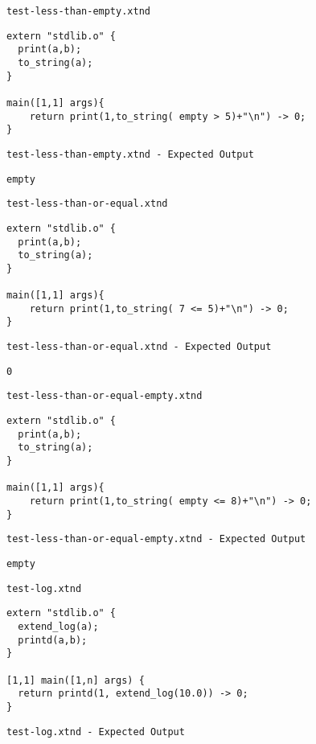 \medskip \noindent \texttt{test-less-than-empty.xtnd}


\begin{lstlisting}
extern "stdlib.o" {
  print(a,b);
  to_string(a);
}

main([1,1] args){
	return print(1,to_string( empty > 5)+"\n") -> 0;
}
\end{lstlisting}


\medskip \noindent \texttt{test-less-than-empty.xtnd - Expected Output}


\begin{lstlisting}
empty
\end{lstlisting}


\medskip \noindent \texttt{test-less-than-or-equal.xtnd}


\begin{lstlisting}
extern "stdlib.o" {
  print(a,b);
  to_string(a);
}

main([1,1] args){
	return print(1,to_string( 7 <= 5)+"\n") -> 0;
}
\end{lstlisting}


\medskip \noindent \texttt{test-less-than-or-equal.xtnd - Expected Output}


\begin{lstlisting}
0
\end{lstlisting}


\medskip \noindent \texttt{test-less-than-or-equal-empty.xtnd}


\begin{lstlisting}
extern "stdlib.o" {
  print(a,b);
  to_string(a);
}

main([1,1] args){
	return print(1,to_string( empty <= 8)+"\n") -> 0;
}
\end{lstlisting}


\medskip \noindent \texttt{test-less-than-or-equal-empty.xtnd - Expected Output}


\begin{lstlisting}
empty
\end{lstlisting}


\medskip \noindent \texttt{test-log.xtnd}


\begin{lstlisting}
extern "stdlib.o" {
  extend_log(a);
  printd(a,b);
}

[1,1] main([1,n] args) {
  return printd(1, extend_log(10.0)) -> 0;
}
\end{lstlisting}


\medskip \noindent \texttt{test-log.xtnd - Expected Output}


